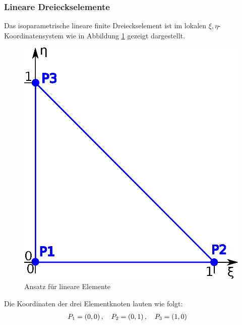 \subsubsection{Lineare Dreieckselemente}
\label{sec:linear_triangles}
Das isoparametrische lineare finite Dreieckselement ist im lokalen $\xi,\eta$-Koordinatensystem wie in Abbildung \ref{fig:linear_element} gezeigt dargestellt. \newline

\begin{figure}
	\begin{center}
		\includegraphics[scale=0.65]{pics/linear_element.eps}
	\end{center}
	\caption{Ansatz für lineare Elemente}
	\label{fig:linear_element}
\end{figure}

Die Koordinaten der drei Elementknoten lauten wie folgt:
\begin{align}
&P_1 = \left(0, 0 \right), \quad P_2 = \left(0, 1 \right), \quad P_3 = \left(1, 0 \right)
\end{align}

